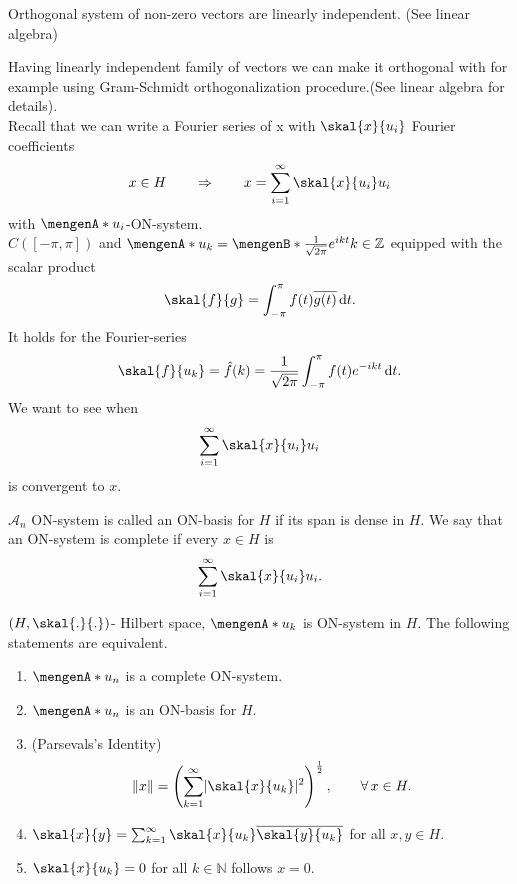 	\begin{proposition}
		Orthogonal system of non-zero vectors are linearly independent. (See linear algebra)
	\end{proposition}
	Having linearly independent family of vectors we can make it orthogonal with for example using Gram-Schmidt orthogonalization procedure.(See linear algebra for details). \\
	Recall that we can write a Fourier series of x with $\skal{x}{u_i}$ Fourier coefficients
		\[
			x \in H \qquad \Rightarrow \qquad x = \sum^{\infty}_{i=1} \skal{x}{u_i}u_i
		\]
		with $\set{u_i}$-ON-system. \\
		$C([- \pi, \pi])$ and $\set{u_k} = \set[\frac{1}{\sqrt{2 \pi}} e^{ikt}]{k \in \mathbb{Z}}$ equipped with the scalar product
		\[
			\skal{f}{g} = \int_{- \pi}^{\pi}f(t)\overline{g(t)} \,\mathrm{d}t.
		\]
		It holds for the Fourier-series
		\[
			\skal{f}{u_k} = \hat f(k) = \frac{1}{\sqrt{2 \pi}}\int_{- \pi }^{\pi} f(t) e^{- ikt} \,\mathrm{d}t.
		\]
		We want to see when
		\[
			\sum^{\infty}_{i=1} \skal{x}{u_i}u_i
		\]
		is convergent to $x$.
		\begin{definition}
			$\mathcal{A}_n$ ON-system is called an ON-basis for $H$ if its span is dense in $H$. We say that an ON-system is complete if every $x \in H$ is 
			\[
				\sum^{\infty}_{i=1} \skal{x}{u_i}u_i.
			\]
		\end{definition}
	\begin{theorem}
		$(H, \skal{.}{.})$- Hilbert space, $\set{u_k}$ is ON-system in $H$. The following statements are equivalent.
		\begin{enumerate}[(1)]
			\item $\set{u_n}$ is a complete ON-system.
			\item $\set{u_n}$ is an ON-basis for $H$.
			\item (Parsevals's Identity) 
			\[
				\norm{x} = \left( \sum_{k=1}^{\infty} \abs{\skal{x}{u_k}}^2 \right)^{\frac{1}{2}}, \qquad \forall\, x \in H.
			\]
			\item $\skal{x}{y} = \sum_{k=1}^{\infty} \skal{x}{u_k} \overline{\skal{y}{u_k}}$ for all $x,y \in H$.
			\item $\skal{x}{u_k} = 0$ for all $k \in \mathbb{N}$ follows $x = 0$.
		\end{enumerate}
	\end{theorem}
